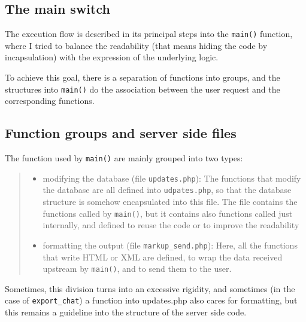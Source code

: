 \documentclass[10pt,a4paper,english]{book}
\begin{document}
\hypertarget{the-main-switch}{}
\subsection{The main switch}
\label{the-main-switch}

The execution flow is described in its principal steps into the
\texttt{main()} function, where I tried to balance the readability (that
means hiding the code by incapsulation) with the expression of the
underlying logic.

To achieve this goal, there is a separation of functions into groups,
and the structures into \texttt{main()} do the association between the user
request and the corresponding functions.



\hypertarget{function-groups-and-server-side-files}{}
\subsection{Function groups and server side files}
\label{function-groups-and-server-side-files}

The function used by \texttt{main()} are mainly grouped into two types:
\begin{quote}
\begin{itemize}
\item {} 
modifying the database (file \texttt{updates.php}): The functions that
modify the database are all defined into \texttt{udpates.php}, so that
the database structure is somehow encapsulated into this file. The
file contains the functions called by \texttt{main()}, but it contains
also functions called just internally, and defined to reuse the
code or to improve the readability

\item {} 
formatting the output (file \texttt{markup{\_}send.php}): Here, all the
functions that write HTML or XML are defined, to wrap the data
received upstream by \texttt{main()}, and to send them to the user.

\end{itemize}
\end{quote}

Sometimes, this division turns into an excessive rigidity, and
sometimes (in the case of \texttt{export{\_}chat}) a function into updates.php
also cares for formatting, but this remains a guideline into the
structure of the server side code.
\end{document}
